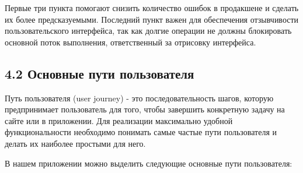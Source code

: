 Первые три пункта помогают снизить количество ошибок в продакшене и сделать их более предсказуемыми. Последний пункт важен для обеспечения отзывчивости пользовательского интерфейса, так как долгие операции не должны блокировать основной поток выполнения, ответственный за отрисовку интерфейса.

\subsection*{4.2 Основные пути пользователя}

Путь пользователя (user journey) - это последовательность шагов, которую предпринимает пользователь для того, чтобы завершить конкретную задачу на сайте или в приложении. Для реализации максимально удобной функциональности необходимо понимать самые частые пути пользователя и делать их наиболее простыми для него.

В нашем приложении можно выделить следующие основные пути пользователя:

